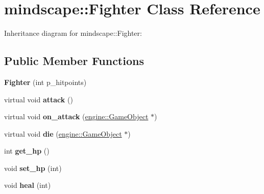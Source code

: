 \hypertarget{classmindscape_1_1_fighter}{}\section{mindscape\+:\+:Fighter Class Reference}
\label{classmindscape_1_1_fighter}


Inheritance diagram for mindscape\+:\+:Fighter\+:
\subsection*{Public Member Functions}
\begin{DoxyCompactItemize}
\item 
{\bfseries Fighter} (int p\+\_\+hitpoints)\hypertarget{classmindscape_1_1_fighter_a9d9d91fbd922093052ddc11d0eb25090}{}\label{classmindscape_1_1_fighter_a9d9d91fbd922093052ddc11d0eb25090}

\item 
virtual void {\bfseries attack} ()\hypertarget{classmindscape_1_1_fighter_ae0327ee59ec712da56d4ddf7f23e8fae}{}\label{classmindscape_1_1_fighter_ae0327ee59ec712da56d4ddf7f23e8fae}

\item 
virtual void {\bfseries on\+\_\+attack} (\hyperlink{classengine_1_1_game_object}{engine\+::\+Game\+Object} $\ast$)\hypertarget{classmindscape_1_1_fighter_a78c815109013e3ce23ca6cba8d9c4e73}{}\label{classmindscape_1_1_fighter_a78c815109013e3ce23ca6cba8d9c4e73}

\item 
virtual void {\bfseries die} (\hyperlink{classengine_1_1_game_object}{engine\+::\+Game\+Object} $\ast$)\hypertarget{classmindscape_1_1_fighter_a6cdc510f287d740f57ac76d5ae220c1c}{}\label{classmindscape_1_1_fighter_a6cdc510f287d740f57ac76d5ae220c1c}

\item 
int {\bfseries get\+\_\+hp} ()\hypertarget{classmindscape_1_1_fighter_a36f9714df967354dc98f97bf0eabe6b2}{}\label{classmindscape_1_1_fighter_a36f9714df967354dc98f97bf0eabe6b2}

\item 
void {\bfseries set\+\_\+hp} (int)\hypertarget{classmindscape_1_1_fighter_a0c048e02ee77ba088a47c51211dbf6c7}{}\label{classmindscape_1_1_fighter_a0c048e02ee77ba088a47c51211dbf6c7}

\item 
void {\bfseries heal} (int)\hypertarget{classmindscape_1_1_fighter_a8672d19748aba79323c77a2b93166d1d}{}\label{classmindscape_1_1_fighter_a8672d19748aba79323c77a2b93166d1d}


\end{DoxyCompactItemize}
